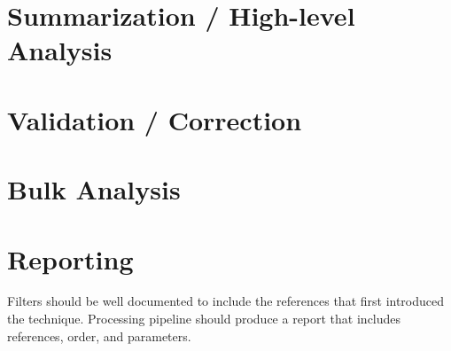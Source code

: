 \documentclass[11pt]{article}
\begin{document}
	\section{Summarization / High-level Analysis}\label{sec:sum_highlevel_analysis}
	
	\section{Validation / Correction}\label{sec:validation_correction}
	
	\section{Bulk Analysis}\label{sec:bulk_analysis}
	
	\section{Reporting}\label{sec:reporting}
		Filters should be well documented to include the references that first introduced the technique.
		Processing pipeline should produce a report that includes references, order, and parameters.



	\newpage
	
\end{document}

